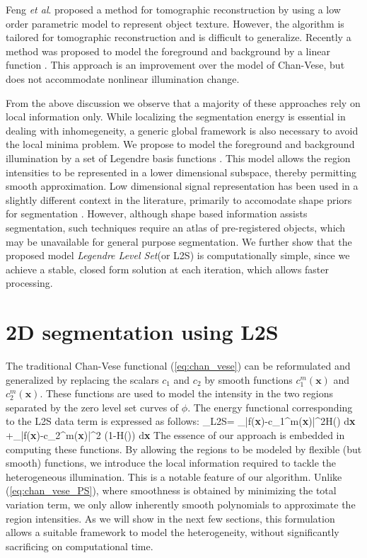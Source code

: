 Feng \textit{et al}.  \cite{feng2000tomographic} proposed a method for tomographic reconstruction by using a low order parametric model to represent object texture. However, the algorithm is tailored for tomographic reconstruction and is difficult to generalize. Recently a method was proposed to model the foreground and background by a linear function \cite{du_linear_approx}. This approach is an improvement over the model of Chan-Vese, but does not accommodate nonlinear illumination change.  

From the above discussion we observe that a majority of these approaches rely on local information only. While localizing the segmentation energy is essential in dealing with inhomegeneity, a generic global framework is also necessary to avoid the local minima problem. We propose to model the foreground and background illumination by a set of Legendre basis functions \cite{mukherjee_L2S}. This model allows the region intensities to be represented in a lower dimensional subspace, thereby permitting smooth approximation. Low dimensional signal representation has been used in a slightly different context in the literature, primarily to accomodate shape priors for segmentation \cite{fritscher20073d,huang2008metamorphs}.  However, although shape based information assists segmentation, such techniques require an atlas of pre-registered objects, which may be unavailable for general purpose segmentation. 
We further show that the proposed model \textit{Legendre Level Set}(or L2S) is computationally simple, since we achieve a stable, closed form solution at each iteration, which allows faster processing.

\section{2D segmentation using L2S}

The traditional Chan-Vese functional (\ref{eq:chan_vese}) can be reformulated and generalized by replacing the scalars $c_1$ and $c_2$ by   smooth functions $c_1^m(\textbf{x})$ and $c_2^m(\textbf{x})$. These functions are used to model the intensity in the two regions separated by the zero level set curves of $\phi$. The energy functional corresponding to the L2S data term is expressed as follows:
\bea
{}_{L2S}= \int_{\Omega}|f(\textbf{x})-c_1^m(\textbf{x})|^2H(\phi) d\textbf{x} 
						   +\int_{\Omega}|f(\textbf{x})-c_2^m(\textbf{x})|^2 \left(1-H(\phi)\right) d\textbf{x}  
\label{eq:L2S_data}
\eea
The essence of our approach is embedded in computing these functions. By allowing the regions to be modeled by flexible (but smooth) functions, we introduce the local information required to tackle the heterogeneous illumination. This is a notable feature of our algorithm. Unlike (\ref{eq:chan_vese_PS}), where smoothness is obtained by minimizing the total variation term, we only allow inherently smooth polynomials to approximate the region intensities. As we will show in the next few sections, this formulation allows a suitable framework to model the heterogeneity, without significantly sacrificing on computational time.

